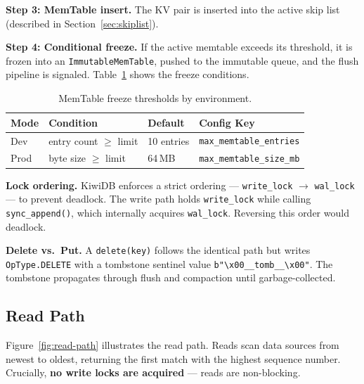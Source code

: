 \documentclass[conference]{IEEEtran}
\begin{document}
\textbf{Step 3: MemTable insert.} The KV pair is inserted into the active skip list (described in Section~\ref{sec:skiplist}).

\textbf{Step 4: Conditional freeze.} If the active memtable exceeds its threshold, it is frozen into an \texttt{ImmutableMemTable}, pushed to the immutable queue, and the flush pipeline is signaled. Table~\ref{tab:freeze-thresholds} shows the freeze conditions.

\begin{table}[t]
\centering
\caption{MemTable freeze thresholds by environment.}
\label{tab:freeze-thresholds}
\begin{tabular}{@{}llll@{}}
\toprule
\textbf{Mode} & \textbf{Condition} & \textbf{Default} & \textbf{Config Key} \\
\midrule
Dev & entry count $\geq$ limit & 10 entries & \texttt{max\_memtable\_entries} \\
Prod & byte size $\geq$ limit & 64\,MB & \texttt{max\_memtable\_size\_mb} \\
\bottomrule
\end{tabular}
\end{table}

\textbf{Lock ordering.} KiwiDB enforces a strict ordering --- \texttt{write\_lock} $\rightarrow$ \texttt{wal\_lock} --- to prevent deadlock. The write path holds \texttt{write\_lock} while calling \texttt{sync\_append()}, which internally acquires \texttt{wal\_lock}. Reversing this order would deadlock.

\textbf{Delete vs.\ Put.} A \texttt{delete(key)} follows the identical path but writes \texttt{OpType.DELETE} with a tombstone sentinel value \texttt{b"\textbackslash x00\_\_tomb\_\_\textbackslash x00"}. The tombstone propagates through flush and compaction until garbage-collected.

\subsection{Read Path}

Figure~\ref{fig:read-path} illustrates the read path. Reads scan data sources from newest to oldest, returning the first match with the highest sequence number. Crucially, \textbf{no write locks are acquired} --- reads are non-blocking.
\end{document}
